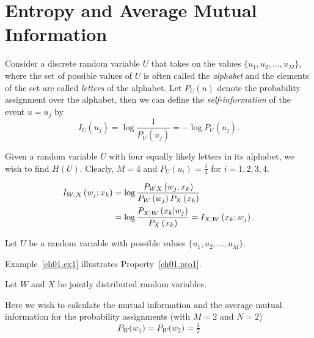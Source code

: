 \section{Entropy and Average Mutual Information}
\label{ch01.sec2}

Consider a discrete random variable $U$ that takes on
the values $\{u_1, u_2, \dots, u_M\}$, where the set of possible
values of $U$ is often called the \textit{alphabet} and the elements
of the set are called \textit{letters} of the alphabet. Let $P_U(u)$
denote the probability  assignment  over the alphabet, then we can
define the \textit{self-information} of the event $ u = u_j $ by
\begin{equation}
  I_U \left( u_j \right) = \log \frac{1}{P_U (u_j)} = - \log P_U
    \left( u_j \right).
\label{ch01.eq1}
\end{equation}

\begin{example}
\label{ch01.ex1}
Given a random variable $U$ with four equally likely letters
in its alphabet, we wish to find $H(U)$. Clearly, $M=4$
and $P_U(u_i)= \tfrac{1}{4}$ for $ i = 1, 2, 3, 4 $.

\begin{align}
    I_{W;X}\left(w_j;x_k\right)
    & = \log
    \frac{P_{WX}\left(w_j, x_k\right)}{P_W\left(w_j\right)
              P_X\left(x_k\right)}
    \notag\\
    & = \log
    \frac{P_{X|W} \left( x_k | w_j\right)} {P_X \left(x_k\right)}
    =
     I_{X;W} \left(x_k; w_j\right).
\label{ch01.eq2}
\end{align}
\end{example}

\begin{property}
\label{ch01.pro1}
Let $U$ be a random variable with possible values $\{u_1,u_2,\dots, u_M\}$.
\end{property}

Example~\ref{ch01.ex1} illustrates Property~\ref{ch01.pro1}.

\begin{property}
\label{ch01.pro2}
Let $W$ and $X$ be jointly distributed random variables.
\end{property}

\begin{example}
\label{ch01.ex2}
Here we wish to calculate the mutual information and the average
mutual information for the probability assignments
(with $M=2$ and $N=2$)
\begin{equation}
 P_W \big(w_1\big) = P_W \big(w_2\big) = \tfrac{1}{2}
\label{ch01.eq3}
\end{equation}
\end{example}

